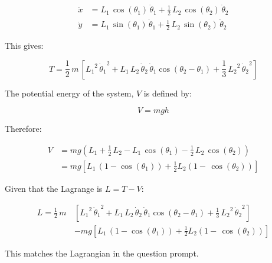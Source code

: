 \documentclass[12pt, letterpaper]{../assignment}
\begin{document}
\begin{equation*}
    \begin{aligned}
    \dot{x} &= L_{1}\,\cos\left(\theta _{1}\right)\,\dot{\theta} _{1}+\frac{1}{2}\,L_{2}\,\cos\left(\theta _{2}\right)\,\dot{\theta} _{2} \\
    \dot{y} &= L_{1}\,\sin\left(\theta _{1}\right)\,\dot{\theta} _{1}+\frac{1}{2}\,L_{2}\,\sin\left(\theta _{2}\right)\,\dot{\theta} _{2}
    \end{aligned}
\end{equation*}

This gives:

$$ T = \frac{1}{2}\,m\,\left[{L_{1}}^2\,{\dot{\theta} _{1}}^2
+L_{1}\,L_{2}\,\dot{\theta} _{2}\,\dot{\theta} _{1}\cos\left(\theta _{2}-\theta _{1}\right)
+\frac{1}{3}\,{L_{2}}^2\,{\dot{\theta} _{2}}^2\right] $$

The potential energy of the system, $V$ is defined by:

$$ V = mgh $$

Therefore:

\begin{equation*}
    \begin{aligned}
    V &= m g \left(L_{1}+\frac{1}{2}\,L_{2}-L_{1}\,\cos\left(\theta _{1}\right)-\frac{1}{2}\,L_{2}\,\cos\left(\theta _{2}\right)\right) \\
    &= m g \left[L_{1}\,\left(1-\cos\left(\theta _{1}\right)\right)+\frac{1}{2} L_{2}\left(1-\,\cos\left(\theta _{2}\right)\right)\right]
    \end{aligned}
\end{equation*}


Given that the Lagrange is $ L = T - V $:

\begin{answer}
\begin{equation*}
\begin{aligned}
            L = \frac{1}{2}\,m\,&\left[{L_{1}}^2\,{\dot{\theta} _{1}}^2
+L_{1}\,L_{2}\,\dot{\theta} _{2}\,\dot{\theta} _{1}\cos\left(\theta _{2}-\theta _{1}\right)
+\frac{1}{3}\,{L_{2}}^2\,{\dot{\theta} _{2}}^2\right]\\
&- m g \left[L_{1}\,\left(1-\cos\left(\theta _{1}\right)\right)+\frac{1}{2} L_{2}\left(1-\,\cos\left(\theta _{2}\right)\right)\right]
\end{aligned}
\end{equation*}
\end{answer}

This matches the Lagrangian in the question prompt.
\end{document}
